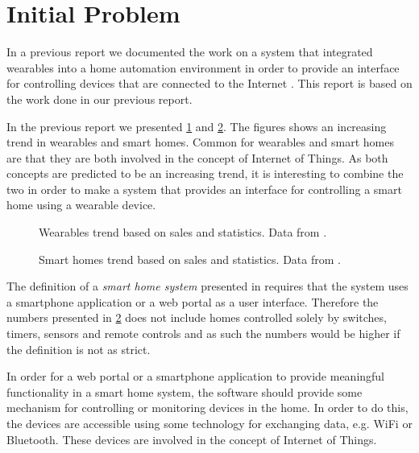 \section{Initial Problem}
\label{sec:initproblem}

In a previous report we documented the work on a system that integrated wearables into a home automation environment in order to provide an interface for controlling devices that are connected to the Internet \cite{prespecialisation}. This report is based on the work done in our previous report.

In the previous report \cite[pp. 1-4]{prespecialisation} we presented \cref{fig:wearables-trend} and \cref{fig:smarthomestrend}. The figures shows an increasing trend in wearables and smart homes. Common for wearables and smart homes are that they are both involved in the concept of Internet of Things. As both concepts are predicted to be an increasing trend, it is interesting to combine the two in order to make a system that provides an interface for controlling a smart home using a wearable device.

\begin{figure}[!hbt]
  \centering
  
  \caption{Wearables trend based on sales and statistics. Data from \protect\cite{WEARABLESTRENDNUMBERS}.}
  \label{fig:wearables-trend}
\end{figure}

\begin{figure}[!hbt]
  \centering
  
  \caption{Smart homes trend based on sales and statistics. Data from \protect\cite{SMARTHOMETREND}.}
  \label{fig:smarthomestrend}
\end{figure}

The definition of a \emph{smart home system} presented in \cite{SMARTHOMETREND} requires that the system uses a smartphone application or a web portal as a user interface. Therefore the numbers presented in \cref{fig:smarthomestrend} does not include homes controlled solely by switches, timers, sensors and remote controls and as such the numbers would be higher if the definition is not as strict.

In order for a web portal or a smartphone application to provide meaningful functionality in a smart home system, the software should provide some mechanism for controlling or monitoring devices in the home. In order to do this, the devices are accessible using some technology for exchanging data, e.g. WiFi or Bluetooth. These devices are involved in the concept of Internet of Things. 

